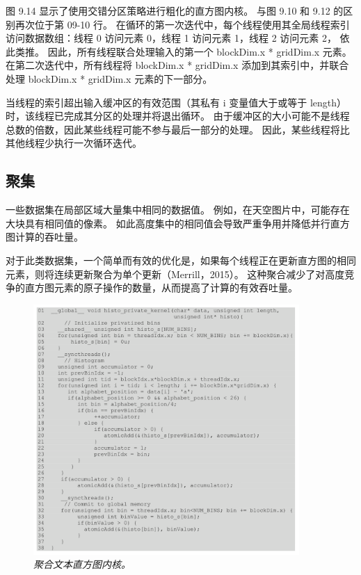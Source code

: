 图 9.14 显示了使用交错分区策略进行粗化的直方图内核。 与图 9.10 和 9.12 的区别再次位于第 09-10 行。 
在循环的第一次迭代中，每个线程使用其全局线程索引访问数据数组：线程 0 访问元素 0，线程 1 访问元素 1，线程 2 访问元素 2，
依此类推。 因此，所有线程联合处理输入的第一个 blockDim.x * gridDim.x 元素。 
在第二次迭代中，所有线程将 blockDim.x * gridDim.x 添加到其索引中，并联合处理 blockDim.x * gridDim.x 元素的下一部分。

当线程的索引超出输入缓冲区的有效范围（其私有 i 变量值大于或等于 length）时，该线程已完成其分区的处理并将退出循环。 
由于缓冲区的大小可能不是线程总数的倍数，因此某些线程可能不参与最后一部分的处理。 
因此，某些线程将比其他线程少执行一次循环迭代。

\subsection{聚集}
一些数据集在局部区域大量集中相同的数据值。 例如，在天空图片中，可能存在大块具有相同值的像素。 
如此高度集中的相同值会导致严重争用并降低并行直方图计算的吞吐量。

对于此类数据集，一个简单而有效的优化是，如果每个线程正在更新直方图的相同元素，则将连续更新聚合为单个更新（Merrill，2015）。 
这种聚合减少了对高度竞争的直方图元素的原子操作的数量，从而提高了计算的有效吞吐量。

\begin{figure}[H]
	\centering
	\includegraphics[width=0.9\textwidth]{figs/F9.15.png}
	\caption{\textit{聚合文本直方图内核。}}
\end{figure}


